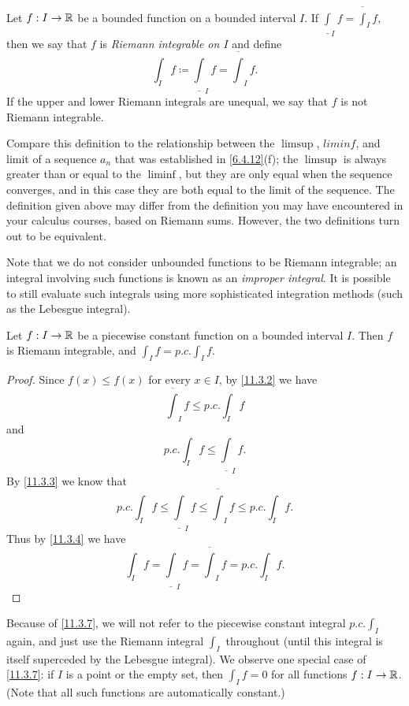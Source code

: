 \begin{defn}\label{11.3.4}
  Let \(f : I \to \mathbb{R}\) be a bounded function on a bounded interval \(I\).
  If \(\underline{\int}_I f = \overline{\int}_I f\), then we say that \(f\) is \emph{Riemann integrable on \(I\)} and define
  \[
    \int_I f \coloneqq \underline{\int}_I f = \overline{\int}_I f.
  \]
  If the upper and lower Riemann integrals are unequal, we say that \(f\) is not Riemann integrable.
\end{defn}

\begin{rmk}\label{11.3.5}
  Compare this definition to the relationship between the \(\limsup\), \(liminf\), and limit of a sequence \(a_n\) that was established in \cref{6.4.12}(f);
  the \(\limsup\) is always greater than or equal to the \(\liminf\), but they are only equal when the sequence converges, and in this case they are both equal to the limit of the sequence.
  The definition given above may differ from the definition you may have encountered in your calculus courses, based on Riemann sums.
  However, the two definitions turn out to be equivalent.
\end{rmk}

\begin{rmk}\label{11.3.6}
  Note that we do not consider unbounded functions to be Riemann integrable;
  an integral involving such functions is known as an \emph{improper integral}.
  It is possible to still evaluate such integrals using more sophisticated integration methods (such as the Lebesgue integral).
\end{rmk}

\begin{lem}\label{11.3.7}
  Let \(f : I \to \mathbb{R}\) be a piecewise constant function on a bounded interval \(I\).
  Then \(f\) is Riemann integrable, and \(\int_I f = p.c. \int_I f\).
\end{lem}

\begin{proof}
  Since \(f(x) \leq f(x)\) for every \(x \in I\), by \cref{11.3.2} we have
  \[
    \overline{\int}_I f \leq p.c. \int_I f
  \]
  and
  \[
    p.c. \int_I f \leq \underline{\int}_I f.
  \]
  By \cref{11.3.3} we know that
  \[
    p.c. \int_I f \leq \underline{\int}_I f \leq \overline{\int}_I f \leq p.c. \int_I f.
  \]
  Thus by \cref{11.3.4} we have
  \[
    \int_I f = \underline{\int}_I f = \overline{\int}_I f = p.c. \int_I f.
  \]
\end{proof}

\begin{rmk}\label{11.3.8}
  Because of \cref{11.3.7}, we will not refer to the piecewise constant integral \(p.c. \int_I\) again, and just use the Riemann integral \(\int_I\) throughout
  (until this integral is itself superceded by the Lebesgue integral).
  We observe one special case of \cref{11.3.7}:
  if \(I\) is a point or the empty set, then \(\int_I f = 0\) for all functions \(f : I \to \mathbb{R}\).
  (Note that all such functions are automatically constant.)
\end{rmk}

